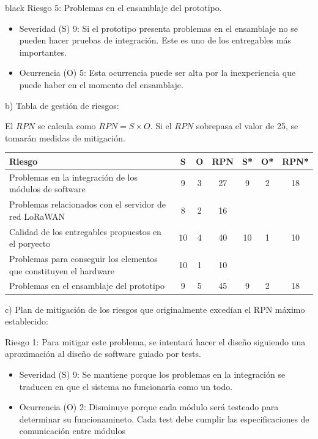 \documentclass[11pt]{charter}
\begin{document}
\begin{consigna}{black}
Riesgo 5: Problemas en el ensamblaje del prototipo.
\begin{itemize}
	\item Severidad (S) 9: Si el prototipo presenta problemas en el ensamblaje no se pueden hacer pruebas de integración. Este es uno de los entregables más importantes.
	\item Ocurrencia (O) 5: Esta ocurrencia puede ser alta por la inexperiencia que puede haber en el momento del ensamblaje.
\end{itemize}

b) Tabla de gestión de riesgos:      

El $RPN$ se calcula como $RPN=S \times O$. Si el $RPN$ sobrepasa el valor de 25, se tomarán medidas de mitigación.

\begin{table}[H]
\centering
\begin{tabularx}{\linewidth}{@{}|X|c|c|c|c|c|c|@{}}
\hline
\rowcolor[HTML]{C0C0C0} 
Riesgo & S & O & RPN & S* & O* & RPN* \\ \hline
Problemas en la integración de los módulos de software       & 9  & 3  &   27  & 9   & 2   &  18    \\ \hline
Problemas relacionados con el servidor de red LoRaWAN & 8 & 2 & 16 & & & \\ \hline
Calidad de los entregables propuestos en el poryecto & 10 & 4 & 40 & 10  & 1 &  10 \\ \hline
 Problemas para conseguir los elementos que constituyen el hardware      & 10  &  1 &  10   &    &    &     \\ \hline
Problemas en el ensamblaje del prototipo & 9  & 5  &  45   &  9  &  2  &  18    \\ \hline
\end{tabularx}%
\end{table}

c) Plan de mitigación de los riesgos que originalmente excedían el RPN máximo establecido:
 
 Riesgo 1: Para mitigar este problema, se intentará hacer el diseño siguiendo una aproximación al diseño de software guiado por tests.
 \begin{itemize}
 	\item Severidad (S) 9: Se mantiene porque los problemas en la integración se traducen en que el sistema no funcionaría como un todo.
 	\item Ocurrencia (O) 2: Disminuye porque cada módulo será testeado para determinar su funcionamineto. Cada test debe cumplir las especificaciones de comunicación entre módulos
 \end{itemize}


\end{consigna}
\end{document}
